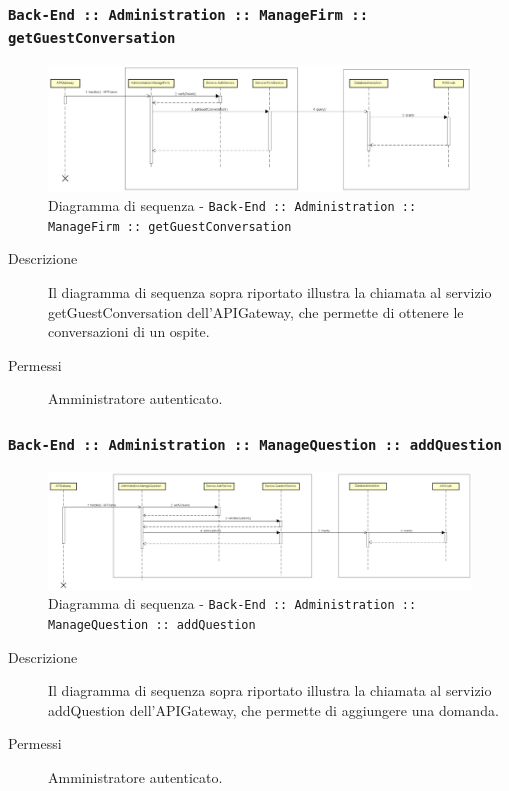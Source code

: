 \documentclass[../DefinizioneDiProdotto_v2.0.0.tex]{subfiles}
\begin{document}
\newpage
\subsubsection{\texttt{Back-End :: Administration :: ManageFirm :: getGuestConversation}}
\begin{figure}[!h]
	\centering
	\includegraphics[scale=0.3]{DiagrammiSequenza/Back-End/manageFirm/getGuestConversation.png}
	\caption{Diagramma di sequenza - \texttt{Back-End :: Administration :: ManageFirm :: getGuestConversation }}
\end{figure}
\begin{description}
	\item [Descrizione] Il diagramma di sequenza sopra riportato illustra la chiamata al servizio getGuestConversation dell'APIGateway, che permette di ottenere le conversazioni di un ospite.
	\item [Permessi] Amministratore autenticato.
\end{description}

\subsubsection{\texttt{Back-End :: Administration :: ManageQuestion :: addQuestion}}
\begin{figure}[!h]
	\centering
	\includegraphics[scale=0.3]{DiagrammiSequenza/Back-End/manageQuestion/addQuestion.png}
	\caption{Diagramma di sequenza - \texttt{Back-End :: Administration :: ManageQuestion :: addQuestion }}
\end{figure}
\begin{description}
	\item [Descrizione] Il diagramma di sequenza sopra riportato illustra la chiamata al servizio addQuestion dell'APIGateway, che permette di aggiungere una domanda.
	\item [Permessi] Amministratore autenticato.
\end{description}
\end{document}
